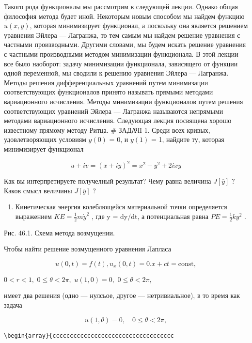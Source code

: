 \documentclass[
  ukrainian,
]{article}
\providecommand{\tightlist}{%
  \setlength{\itemsep}{0pt}\setlength{\parskip}{0pt}}
\begin{document}
Такого рода функционалы мы рассмотрим в следующей лекции. Однако общая
философия метода будет иной. Некоторым новым способом мы найдем функцию
\(u(x, y)\), которая минимизирует функционал, а поскольку она является
решением уравнения Эйлера --- Лагранжа, то тем самым мы найдем решение
уравнения с частными производными. Другими словами, мы будем искать
решение уравнения с частными производными методом минимизации
функционала. В этой лекции все было наоборот: задачу минимизации
функционала, зависящего от функции одной переменной, мы сводили к
решению уравнения Эйлера --- Лагранжа. Методы решения дифференциальных
уравнений путем минимизации соответствующих функционалов принято
называть прямыми методами вариационного исчисления. Методы минимизации
функционалов путем решения соответствующих уравнений Эйлера --- Лагранжа
называются непрямыми методами вариационного исчисления. Следующая лекция
посвящена хорошо известному прямому методу Ритца. \# ЗАДАЧІ 1. Среди
всех кривых, удовлетворяющих условиям \(y(0)\) = 0, и \(y(1)\) = 1,
найдите ту, которая минимизирует функционал

\[
u + iv = (x + iy)^2 = x^2 - y^2 + 2ixy
\]

Как вы интерпретируете получелный результат? Чему равна величина
\(J[\overline{y}]\) ? Каков смысл величины \(J[\overline{y}]\) ?

\begin{enumerate}
\def\labelenumi{\arabic{enumi}.}
\setcounter{enumi}{1}
\tightlist
\item
  Кинетическая энергия колеблющейся материальной точки определяется
  выражением \(KE = \frac{1}{2} m\dot{y}^2\) , где y = dy/dt, а
  потенциальная равна \(PE = \frac{1}{2} ky^2\) .
\end{enumerate}

Рис. 46.1. Схема метода возмущении.

Чтобы найти решение возмущенного уравнения Лапласа

\[
u(0, t) = f(t),
u_{x}(0, t) = 0.
x + ct = \text{const},
\]

\(0 < r < 1,\) \(0 \le \theta < 2\pi,\) \(u(1, 0) = 0,\)
\(0 \le \theta < 2\pi,\)

нмеет два решения (одно --- нулсьое, другое --- нетривиальное), в то
время как задача

\[
u(1, \theta) = 0, \quad 0 \le \theta < 2\pi,
\]

\begin{verbatim}
\begin{array}{ccccccccccccccccccccccccccccccccccc
\end{verbatim}
\end{document}
